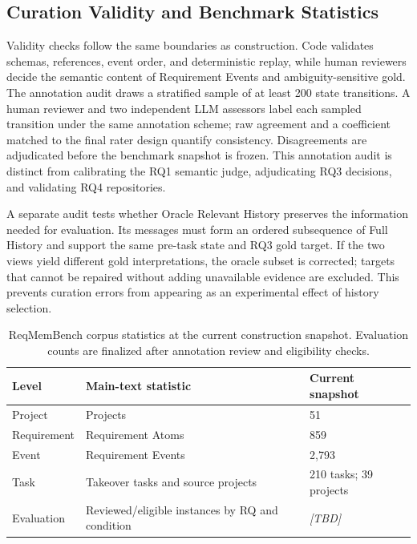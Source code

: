 \documentclass{article} %
\newcommand{\placeholder}[1]{\emph{[#1]}}
\begin{document}
\subsection{Curation Validity and Benchmark Statistics}

Validity checks follow the same boundaries as construction. Code validates schemas, references, event order, and deterministic replay, while human reviewers decide the semantic content of Requirement Events and ambiguity-sensitive gold. The annotation audit draws a stratified sample of at least 200 state transitions. A human reviewer and two independent LLM assessors label each sampled transition under the same annotation scheme; raw agreement and a coefficient matched to the final rater design quantify consistency. Disagreements are adjudicated before the benchmark snapshot is frozen. This annotation audit is distinct from calibrating the RQ1 semantic judge, adjudicating RQ3 decisions, and validating RQ4 repositories.

A separate audit tests whether Oracle Relevant History preserves the information needed for evaluation. Its messages must form an ordered subsequence of Full History and support the same pre-task state and RQ3 gold target. If the two views yield different gold interpretations, the oracle subset is corrected; targets that cannot be repaired without adding unavailable evidence are excluded. This prevents curation errors from appearing as an experimental effect of history selection.

\begin{table}[h]
\caption{ReqMemBench corpus statistics at the current construction snapshot. Evaluation counts are finalized after annotation review and eligibility checks.}
\label{tab:statistics}
\centering
\small
\begin{tabular}{@{}p{0.70in}p{2.35in}p{1.00in}@{}}
\toprule
Level & Main-text statistic & Current snapshot \\
\midrule
Project & Projects & 51 \\
Requirement & Requirement Atoms & 859 \\
Event & Requirement Events & 2,793 \\
Task & Takeover tasks and source projects & 210 tasks; 39 projects \\
Evaluation & Reviewed/eligible instances by RQ and condition & \placeholder{TBD} \\
\bottomrule
\end{tabular}
\end{table}
\end{document}
